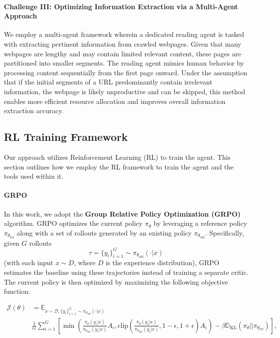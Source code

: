 \documentclass{article}
\begin{document}
\paragraph{Challenge III: Optimizing Information Extraction via a Multi-Agent Approach}

We employ a multi-agent framework wherein a dedicated reading agent is tasked with extracting pertinent information from crawled webpages. Given that many webpages are lengthy and may contain limited relevant content, these pages are partitioned into smaller segments. The reading agent mimics human behavior by processing content sequentially from the first page onward. Under the assumption that if the initial segments of a URL predominantly contain irrelevant information, the webpage is likely unproductive and can be skipped, this method enables more efficient resource allocation and improves overall information extraction accuracy.



\subsection{RL Training Framework}
Our approach utilizes Reinforcement Learning (RL) to train the agent. This section outlines how we employ the RL framework to train the agent and the tools used within it.


\paragraph{GRPO}
In this work, we adopt the \textbf{Group Relative Policy Optimization (GRPO)} algorithm. GRPO optimizes the current policy \(\pi_{\theta}\) by leveraging a reference policy \(\pi_{\theta_{\text{ref}}}\) along with a set of rollouts generated by an existing policy \(\pi_{\theta_{\text{old}}}\). Specifically, given \(G\) rollouts
\[
\tau = \{y_i\}_{i=1}^G \sim \pi_{\theta_{\text{old}}}(\cdot|x)
\]
(with each input \(x \sim D\), where \(D\) is the experience distribution), GRPO estimates the baseline using these trajectories instead of training a separate critic. The current policy is then optimized by maximizing the following objective function:


\begin{equation}
\begin{aligned}
\label{eq:grpo}
  \mathcal{J}(\theta) & = \mathbb{E}_{x \sim \mathcal{D}, \{y_i\}_{i=1}^{G} \sim \pi_{\theta_{\text{old}}}(\cdot|x)} \\
  & \frac{1}{G} \sum_{i=1}^{G} \left[\min \left( \frac{\pi_{\theta}(y_i|x)}{\pi_{\theta_{\text{old}}}(y_i|x)} A_{i}, \text{clip} \left( \frac{\pi_{\theta}(y_i|x)}{\pi_{\theta_{\text{old}}}(y_i|x)}, 1-\epsilon, 1+\epsilon \right) A_{i} \right) - \beta \mathbb{D}_{\text{KL}} \left( \pi_{\theta} || \pi_{\theta_{\text{ref}}} \right)\right],
\end{aligned}
\end{equation}
\end{document}
